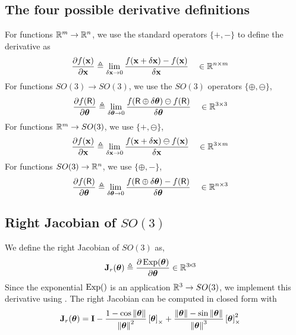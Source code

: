 \subsection{The four possible derivative definitions}

For functions ${\mathbb R}^m\to{\mathbb R}^n$, we use the standard operators $\{+,-\}$ to define the derivative as
%
\begin{align}
\frac{\partial f({\bf x})}{\partial{\bf x}} &\triangleq \lim_{\delta{\bf x}\to0}\frac{f({\bf x}+\delta{\bf x})-f({\bf x})}{\delta{\bf x}} &&\in {\mathbb R}^{n\times m} \label{equ:derivative_vector}
\end{align}
%
For functions $SO(3)\to SO(3)$, we use the $SO(3)$ operators $\{\oplus,\ominus\}$,
%
\begin{align}
\frac{\partial f(\mathsf R)}{\partial{{\bm \theta}}} 
&\triangleq \lim_{\delta{{\bm \theta}}\to0}\frac{f(\mathsf R\oplus\delta{{\bm \theta}})\ominus f(\mathsf R)}{\delta{{\bm \theta}}}  && \in {\mathbb R}^{3\times 3}
\label{equ:derivative_SO3}
\end{align}
%
For functions ${\mathbb R}^m \to SO(3)$, we use $\{+,\ominus\}$,
%
\begin{align}
\frac{\partial f({\bf x})}{\partial{\bf x}} &\triangleq \lim_{\delta{\bf x}\to0} \frac{ f({\bf x}+\delta{\bf x})\ominus f({\bf x})}{\delta{\bf x}} && \in {\mathbb R}^{3\times m} \label{equ:dif_RtoSO3}
\end{align}
%
For functions $SO(3)\to{\mathbb R}^n$, we use $\{\oplus,-\}$,
%
\begin{align}
\frac{\partial f(\mathsf R)}{\partial{{\bm \theta}}} &\triangleq \lim_{\delta{{\bm \theta}}\to0} \frac{f(\mathsf R\oplus\delta{{\bm \theta}}) - f(\mathsf R)}{\delta{{\bm \theta}}} && \in {\mathbb R}^{n\times 3} \label{equ:jacobian_SO3_Rn}
\end{align}



\subsection{Right Jacobian of $SO(3)$ }

We define the right Jacobian of $SO(3)$ as, 
%
\begin{align}\label{equ:Jr}
{\bf J}_r({{\bm \theta}}) &\triangleq \frac{\partial\operatorname*{Exp}({{\bm \theta}})}{\partial{{\bm \theta}}} 
\in{\mathbb R}^{3\!\times\!3}
\end{align}
%
Since the exponential $\operatorname*{Exp}()$ is an application ${\mathbb R}^3\to SO(3)$,
we implement this derivative using .
The right Jacobian 
can be computed in closed form  \cite[pag.~40]{CHIRIKJIAN-12} with
%
\begin{align}
{\bf J}_r({{\bm \theta}}) &= {\bf I} - \frac{1-\cos{\left\|{{\bm \theta}}\right\|}}{{\left\|{{\bm \theta}}\right\|}^2}\left[{{\bm \theta}}\right]_\times + \frac{{\left\|{{\bm \theta}}\right\|}-\sin{\left\|{{\bm \theta}}\right\|}}{{\left\|{{\bm \theta}}\right\|}^3}\left[{{\bm \theta}}\right]_\times^2 
\end{align}






